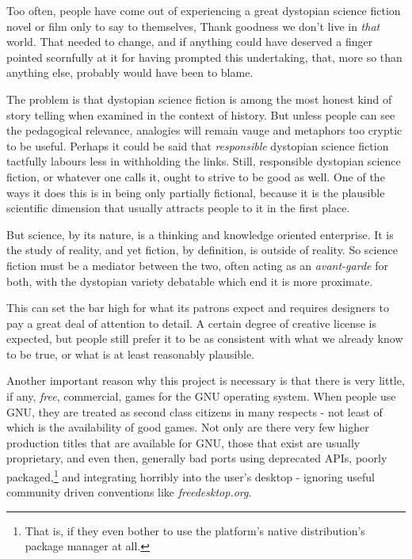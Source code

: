 

Too often, people have come out of experiencing a great dystopian science fiction novel or film only to say to themselves, Thank goodness we don't live in {\it that} world. That needed to change, and if anything could have deserved a finger pointed scornfully at it for having prompted this undertaking, that, more so than anything else, probably would have been to blame.

The problem is that dystopian science fiction is among the most honest kind of story telling when examined in the context of history. But unless people can see the pedagogical relevance, analogies will remain vauge and metaphors too cryptic to be useful. Perhaps it could be said that {\it responsible} dystopian science fiction tactfully labours less in withholding the links.
    {}
Still, responsible dystopian science fiction, or whatever one calls it, ought to strive to be good as well. One of the ways it does this is in being only partially fictional, because it is the plausible scientific dimension that usually attracts people to it in the first place.

But science, by its nature, is a thinking and knowledge oriented enterprise. It is the study of reality, and yet fiction, by definition, is outside of reality. So science fiction must be a mediator between the two, often acting as an {\it avant-garde} for both, with the dystopian variety debatable which end it is more proximate.

This can set the bar high for what its patrons expect and requires designers to pay a great deal of attention to detail. A certain degree of creative license is expected, but people still prefer it to be as consistent with what we already know to be true, or what is at least reasonably plausible.

Another important reason why this project is necessary is that there is very little, if any, {\it free}, commercial, games for the GNU operating system. When people use GNU, they are treated as second class citizens in many respects - not least of which is the availability of good games. Not only are there very few higher production titles that are available for GNU, those that exist are usually proprietary, and even then, generally bad ports using deprecated APIs, poorly packaged,\footnote{That is, if they even bother to use the platform's native distribution's package manager at all.} and integrating horribly into the user's desktop - ignoring  useful community driven conventions like {\it freedesktop.org}. 

